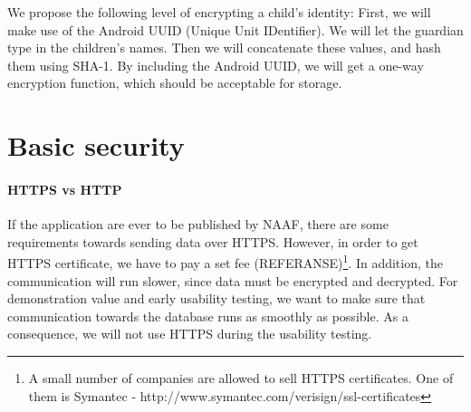 We propose the following level of encrypting a child's identity:
First, we will make use of the Android UUID (Unique Unit IDentifier). We will let the guardian type in the children's names. Then we will concatenate these values, and hash them using SHA-1\cite{sha1}. By including the Android UUID, we will get a one-way encryption function, which should be acceptable for storage.
 




\section{Basic security}
\paragraph{HTTPS vs HTTP} If the application are ever to be published by NAAF, there are some requirements towards sending data over HTTPS. However, in order to get HTTPS certificate, we have to pay a set fee (REFERANSE)\footnote{A small number of companies are allowed to sell HTTPS certificates. One of them is Symantec - http://www.symantec.com/verisign/ssl-certificates}. In addition, the communication will run slower, since data must be encrypted and decrypted. For demonstration value and early usability testing, we want to make sure that communication towards the database runs as smoothly as possible. As a consequence, we will not use HTTPS during the usability testing.


    
